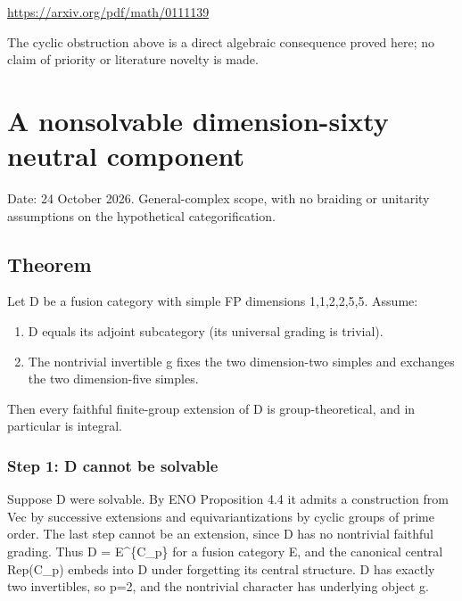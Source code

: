 \url{https://arxiv.org/pdf/math/0111139}

The cyclic obstruction above is a direct algebraic consequence proved
here; no claim of priority or literature novelty is made.

\hypertarget{a-nonsolvable-dimension-sixty-neutral-component}{%
\section{A nonsolvable dimension-sixty neutral
component}\label{a-nonsolvable-dimension-sixty-neutral-component}}

Date: 24 October 2026. General-complex scope, with no braiding or
unitarity assumptions on the hypothetical categorification.

\hypertarget{theorem-1}{%
\subsection{Theorem}\label{theorem-1}}

Let D be a fusion category with simple FP dimensions 1,1,2,2,5,5.
Assume:

\begin{enumerate}
\def\labelenumi{\arabic{enumi}.}
\tightlist
\item
  D equals its adjoint subcategory (its universal grading is trivial).
\item
  The nontrivial invertible g fixes the two dimension-two simples and
  exchanges the two dimension-five simples.
\end{enumerate}

Then every faithful finite-group extension of D is group-theoretical,
and in particular is integral.

\hypertarget{step-1-d-cannot-be-solvable}{%
\subsubsection{Step 1: D cannot be
solvable}\label{step-1-d-cannot-be-solvable}}

Suppose D were solvable. By ENO Proposition 4.4 it admits a construction
from Vec by successive extensions and equivariantizations by cyclic
groups of prime order. The last step cannot be an extension, since D has
no nontrivial faithful grading. Thus D = E\^{}\{C\_p\} for a fusion
category E, and the canonical central Rep(C\_p) embeds into D under
forgetting its central structure. D has exactly two invertibles, so p=2,
and the nontrivial character has underlying object g.

